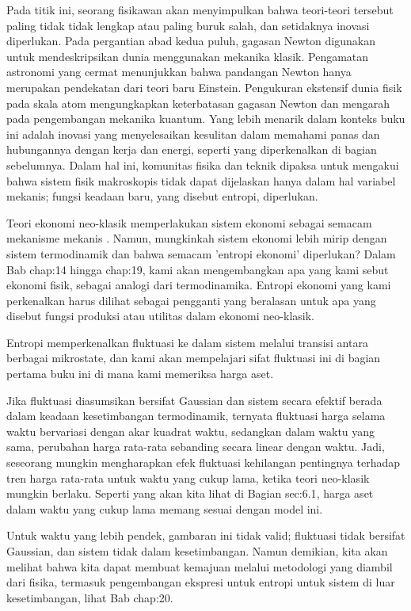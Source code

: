 \documentclass[a4paper,12pt]{book}
\begin{document}
Pada titik ini, seorang fisikawan akan menyimpulkan bahwa teori-teori tersebut paling tidak tidak lengkap atau paling buruk salah, dan setidaknya inovasi diperlukan. Pada pergantian abad kedua puluh, gagasan Newton digunakan untuk mendeskripsikan dunia menggunakan mekanika klasik. Pengamatan astronomi yang cermat menunjukkan bahwa pandangan Newton hanya merupakan pendekatan dari teori baru Einstein. Pengukuran ekstensif dunia fisik pada skala atom mengungkapkan keterbatasan gagasan Newton dan mengarah pada pengembangan mekanika kuantum. Yang lebih menarik dalam konteks buku ini adalah inovasi yang menyelesaikan kesulitan dalam memahami panas dan hubungannya dengan kerja dan energi, seperti yang diperkenalkan di bagian sebelumnya. Dalam hal ini, komunitas fisika dan teknik dipaksa untuk mengakui bahwa sistem fisik makroskopis tidak dapat dijelaskan hanya dalam hal variabel mekanis; fungsi keadaan baru, yang disebut entropi, diperlukan.

Teori ekonomi neo-klasik memperlakukan sistem ekonomi sebagai semacam mekanisme mekanis \cite{backhouse2002, cleaver2011}. Namun, mungkinkah sistem ekonomi lebih mirip dengan sistem termodinamik dan bahwa semacam 'entropi ekonomi' diperlukan? Dalam Bab  {chap:14} hingga  {chap:19}, kami akan mengembangkan apa yang kami sebut ekonomi fisik, sebagai analogi dari termodinamika. Entropi ekonomi yang kami perkenalkan harus dilihat sebagai pengganti yang beralasan untuk apa yang disebut fungsi produksi atau utilitas dalam ekonomi neo-klasik.

Entropi memperkenalkan fluktuasi ke dalam sistem melalui transisi antara berbagai mikrostate, dan kami akan mempelajari sifat fluktuasi ini di bagian pertama buku ini di mana kami memeriksa harga aset.

Jika fluktuasi diasumsikan bersifat Gaussian dan sistem secara efektif berada dalam keadaan kesetimbangan termodinamik, ternyata fluktuasi harga selama waktu bervariasi dengan akar kuadrat waktu, sedangkan dalam waktu yang sama, perubahan harga rata-rata sebanding secara linear dengan waktu. Jadi, seseorang mungkin mengharapkan efek fluktuasi kehilangan pentingnya terhadap tren harga rata-rata untuk waktu yang cukup lama, ketika teori neo-klasik mungkin berlaku. Seperti yang akan kita lihat di Bagian  {sec:6.1}, harga aset dalam waktu yang cukup lama memang sesuai dengan model ini.

Untuk waktu yang lebih pendek, gambaran ini tidak valid; fluktuasi tidak bersifat Gaussian, dan sistem tidak dalam kesetimbangan. Namun demikian, kita akan melihat bahwa kita dapat membuat kemajuan melalui metodologi yang diambil dari fisika, termasuk pengembangan ekspresi untuk entropi untuk sistem di luar kesetimbangan, lihat Bab  {chap:20}.
\end{document}
